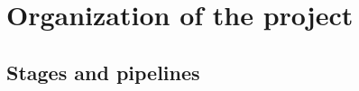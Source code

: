 \section{Organization of the project}\label{sec:organization}



\subsection{Stages and pipelines}\label{subsec:stagespipeline}

